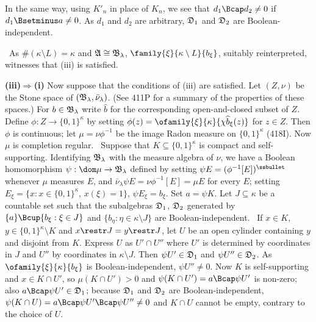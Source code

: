 {

\noindent In the same way, using $K'_n$ in place of $K_n$, we see that
$d_1\Bcap d_2\ne 0$ if $d_1\Bsetminus a\ne 0$.   As $d_1$ and $d_2$ are
arbitrary, $\frak D_1$ and $\frak D_2$ are Boolean-independent.\ \Qed

\medskip

\quad\grheadd\
As $\#(\kappa\setminus L)=\kappa$ and $\frak A\cong\frak B_{\lambda}$,
$\family{\xi}{\kappa\setminus L}{b_{\xi}}$, suitably reinterpreted,
witnesses that (iii) is satisfied.

\medskip

{\bf (iii)$\Rightarrow$(i)} Now suppose that the conditions of (iii) are
satisfied.   Let $(Z,\nu)$ be the Stone space of
$(\frak B_{\lambda},\bar\nu_{\lambda})$.   (See 411P
for a summary of the properties of these spaces.)   For
$b\in\frak B_{\lambda}$ write $\widehat{b}$ for the corresponding
open-and-closed subset of $Z$.    Define $\phi:Z\to\{0,1\}^{\kappa}$ by
setting $\phi(z)=\ofamily{\xi}{\kappa}{\chi\widehat{b}_{\xi}(z)}$ for
$z\in Z$.   Then $\phi$ is continuous;  let $\mu=\nu\phi^{-1}$ be the
image Radon measure on $\{0,1\}^{\kappa}$ (418I).   Now $\mu$ is
completion regular.   \Prf\ Suppose that $K\subseteq\{0,1\}^{\kappa}$ is
compact and self-supporting.   Identifying
$\frak B_{\lambda}$ with the measure algebra of $\nu$, we have a Boolean
homomorphism $\psi:\dom\mu\to\frak B_{\lambda}$ defined by setting
$\psi E=(\phi^{-1}[E])^{\ssbullet}$ whenever $\mu$ measures $E$, and
$\bar\nu_{\lambda}\psi E=\nu\phi^{-1}[E]=\mu E$ for every $E$;  setting
$E_{\xi}=\{x:x\in\{0,1\}^{\kappa}$, $x(\xi)=1\}$,
$\psi E_{\xi}=b_{\xi}$.   Set $a=\psi K$.   Let $J\subseteq\kappa$ be a
countable set such that
the subalgebras $\frak D_1$, $\frak D_2$ generated by
$\{a\}\Bcup\{b_{\xi}:\xi\in J\}$ and
$\{b_{\eta}:\eta\in\kappa\setminus J\}$ are Boolean-independent.
\Quer\ If $x\in K$, $y\in\{0,1\}^{\kappa}\setminus K$ and
$x\restr J=y\restr J$, let $U$ be an open cylinder containing $y$
and disjoint from $K$.   Express $U$ as $U'\cap U''$ where $U'$ is
determined by coordinates in $J$ and $U''$ by coordinates in
$\kappa\setminus J$.   Then $\psi U'\in\frak D_1$ and
$\psi U''\in\frak D_2$.   As $\ofamily{\xi}{\kappa}{b_{\xi}}$ is
Boolean-independent,
$\psi U''\ne 0$.   Now $K$ is self-supporting and $x\in K\cap U'$, so
$\mu(K\cap U')>0$ and $\psi(K\cap U')=a\Bcap\psi U'$ is non-zero;  also
$a\Bcap\psi U'\in\frak D_1$;  because $\frak D_1$ and $\frak D_2$ are
Boolean-independent, $\psi(K\cap U)=a\Bcap\psi U'\Bcap\psi U''\ne 0$ and
$K\cap U$ cannot be empty, contrary to the choice of $U$.\ \Bang

}

